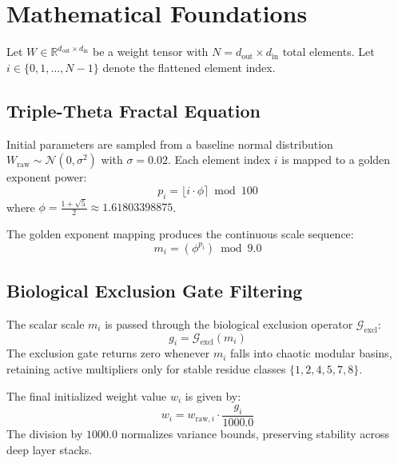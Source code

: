 \section{Mathematical Foundations}
Let $W \in \mathbb{R}^{d_{\text{out}} \times d_{\text{in}}}$ be a weight tensor with $N = d_{\text{out}} \times d_{\text{in}}$ total elements. Let $i \in \{0, 1, \dots, N-1\}$ denote the flattened element index.

\subsection{Triple-Theta Fractal Equation}
Initial parameters are sampled from a baseline normal distribution $W_{\text{raw}} \sim \mathcal{N}(0, \sigma^2)$ with $\sigma = 0.02$. Each element index $i$ is mapped to a golden exponent power:
\begin{equation}
    p_i = \lfloor i \cdot \phi \rceil \bmod 100
\end{equation}
where $\phi = \frac{1+\sqrt{5}}{2} \approx 1.61803398875$.

The golden exponent mapping produces the continuous scale sequence:
\begin{equation}
    m_i = (\phi^{p_i}) \bmod 9.0
\end{equation}

\subsection{Biological Exclusion Gate Filtering}
The scalar scale $m_i$ is passed through the biological exclusion operator $\mathcal{G}_{\text{excl}}$:
\begin{equation}
    g_i = \mathcal{G}_{\text{excl}}(m_i)
\end{equation}
The exclusion gate returns zero whenever $m_i$ falls into chaotic modular basins, retaining active multipliers only for stable residue classes $\{1, 2, 4, 5, 7, 8\}$.

The final initialized weight value $w_i$ is given by:
\begin{equation}
    w_i = w_{\text{raw}, i} \cdot \frac{g_i}{1000.0}
\end{equation}
The division by $1000.0$ normalizes variance bounds, preserving stability across deep layer stacks.
